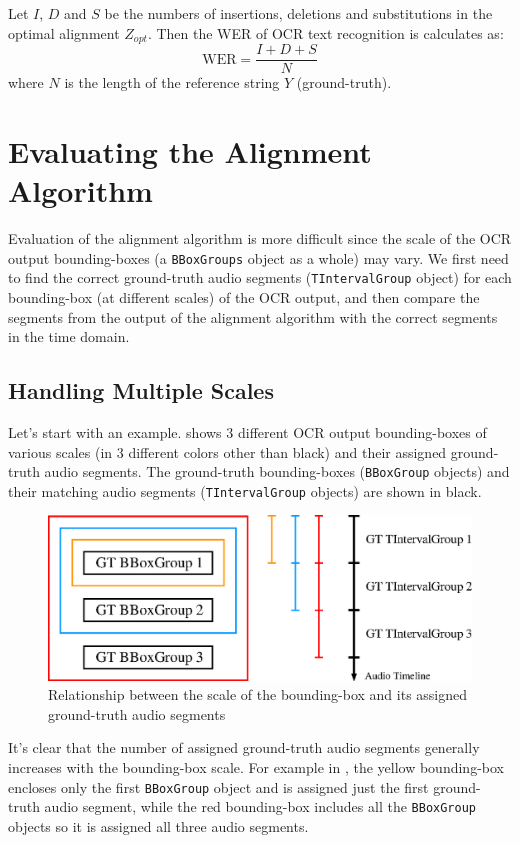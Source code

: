 Let $I$, $D$ and $S$ be the numbers of insertions, deletions and substitutions in the optimal alignment $Z_{opt}$. Then the WER of OCR text recognition is calculates as:
\begin{equation}
    \text{WER} = \frac{I + D + S}{N}
\end{equation}
where $N$ is the length of the reference string $Y$ (ground-truth).


\section{Evaluating the Alignment Algorithm}

Evaluation of the alignment algorithm is more difficult since the scale of the OCR output bounding-boxes (a \texttt{BBoxGroups} object as a whole) may vary. We first need to find the correct ground-truth audio segments (\texttt{TIntervalGroup} object) for each bounding-box (at different scales) of the OCR output, and then compare the segments from the output of the alignment algorithm with the correct segments in the time domain. 

\subsection{Handling Multiple Scales}

Let's start with an example.  shows 3 different OCR output bounding-boxes of various scales (in 3 different colors other than black) and their assigned ground-truth audio segments. The ground-truth bounding-boxes (\texttt{BBoxGroup} objects) and their matching audio segments (\texttt{TIntervalGroup} objects) are shown in black. 

\begin{figure}[!tb]
    \centering
    \includegraphics[width=.8\textwidth]{eval-align-scale.eps}
    \caption{Relationship between the scale of the bounding-box and its assigned ground-truth audio segments}
    \label{fig:eval-align-scale}
\end{figure}

It's clear that the number of assigned ground-truth audio segments generally increases with the bounding-box scale. For example in , the yellow bounding-box encloses only the first \texttt{BBoxGroup} object and is assigned just the first ground-truth audio segment, while the red bounding-box includes all the \texttt{BBoxGroup} objects so it is assigned all three audio segments.

